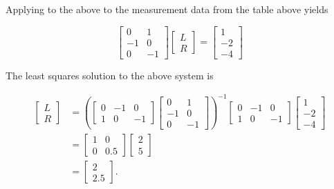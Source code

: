 Applying to the above to the measurement data from the table above yields

\[
	\left[\begin{array}{cc}
		0 & 1 \\
		-1 & 0 \\
		0 & -1
	\end{array}\right]\left[\begin{array}{l}
		L \\
		R
	\end{array}\right]=\left[\begin{array}{c}
		1 \\
		-2 \\
		-4
	\end{array}\right]
\]

The least squares solution to the above system is

\[
	\begin{aligned}
		{\left[\begin{array}{l}
				L \\
				R
			\end{array}\right] } & =\left(\left[\begin{array}{ccc}
			0 & -1 & 0 \\
			1 & 0 & -1
		\end{array}\right]\left[\begin{array}{cc}
			0 & 1 \\
			-1 & 0 \\
			0 & -1
		\end{array}\right]\right)^{-1}\left[\begin{array}{ccc}
			0 & -1 & 0 \\
			1 & 0 & -1
		\end{array}\right]\left[\begin{array}{c}
			1 \\
			-2 \\
			-4
		\end{array}\right] \\
		& =\left[\begin{array}{cc}
			1 & 0 \\
			0 & 0.5
		\end{array}\right]\left[\begin{array}{l}
			2 \\
			5
		\end{array}\right] \\
		& =\left[\begin{array}{c}
			2 \\
			2.5
		\end{array}\right] .
	\end{aligned}
\]

